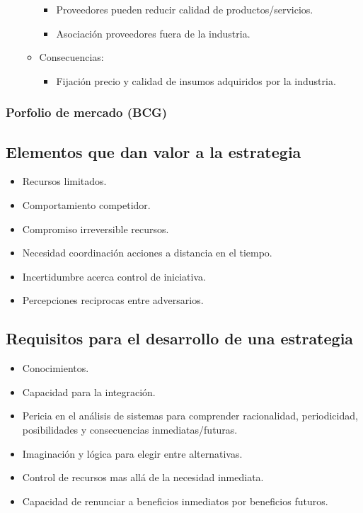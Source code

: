 \documentclass{templateNote}
\begin{document}
\begin{itemize}
\begin{itemize}
\begin{itemize}
                \item Proveedores pueden reducir calidad de productos/servicios.
                \item Asociación proveedores fuera de la industria.
            \end{itemize}
            \item Consecuencias:
            \begin{itemize}
                \item Fijación precio y calidad de insumos adquiridos por la industria.
            \end{itemize}
        \end{itemize}
\end{itemize}

\subsubsection{Porfolio de mercado (BCG)}


\subsection{Elementos que dan valor a la estrategia}
\begin{itemize}
    \item Recursos limitados.
    \item Comportamiento competidor.
    \item Compromiso irreversible recursos.
    \item Necesidad coordinación acciones a distancia en el tiempo.
    \item Incertidumbre acerca control de iniciativa.
    \item Percepciones reciprocas entre adversarios.
\end{itemize}

\subsection{Requisitos para el desarrollo de una estrategia}
\begin{itemize}
    \item Conocimientos.
    \item Capacidad para la integración.
    \item Pericia en el análisis de sistemas para comprender racionalidad, periodicidad, posibilidades y consecuencias inmediatas/futuras.
    \item Imaginación y lógica para elegir entre alternativas.
    \item Control de recursos mas allá de la necesidad inmediata.
    \item Capacidad de renunciar a beneficios inmediatos por beneficios futuros.
\end{itemize}
\end{document}
